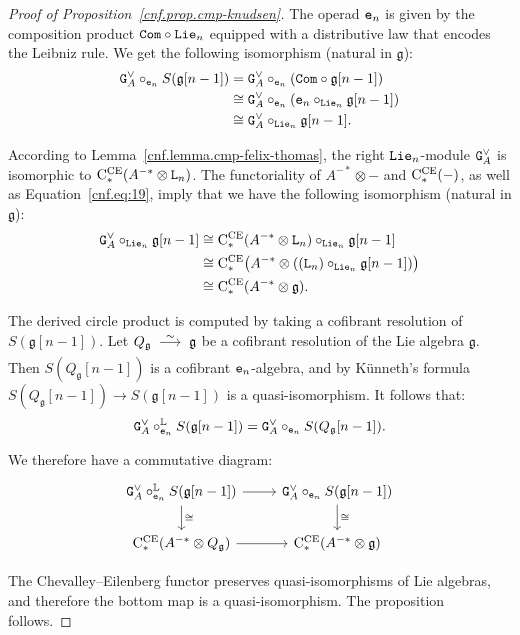 \begin{proof}[Proof of Proposition~\ref{cnf.prop.cmp-knudsen}]
  The operad $\mathtt{e}_{n}$ is given by the composition product $\mathtt{Com} \circ \mathtt{Lie}_{n}$ equipped with a distributive law that encodes the Leibniz rule.
  We get the following isomorphism (natural in $\mathfrak{g}$):
  \begin{align*}
    \mathtt{G}_{A}^{\vee} \circ_{\mathtt{e}_{n}} S(\mathfrak{g}[n-1])
    & = \mathtt{G}_{A}^{\vee} \circ_{\mathtt{e}_{n}} (\mathtt{Com} \circ \mathfrak{g}[n-1]) \\
    & \cong \mathtt{G}_{A}^{\vee} \circ_{\mathtt{e}_{n}} (\mathtt{e}_{n} \circ_{\mathtt{Lie}_{n}} \mathfrak{g}[n-1]) \\
    & \cong \mathtt{G}_{A}^{\vee} \circ_{\mathtt{Lie}_{n}} \mathfrak{g}[n-1].
  \end{align*}

  According to Lemma~\ref{cnf.lemma.cmp-felix-thomas}, the right $\mathtt{Lie}_{n}$-module $\mathtt{G}_{A}^{\vee}$ is isomorphic to $\mathrm{C}_{*}^{\mathrm{CE}}(A^{-*} \otimes \mathtt{L}_{n})$.
  The functoriality of $A^{-*} \otimes -$ and $\mathrm{C}_{*}^{\mathrm{CE}}(-)$, as well as Equation~\eqref{cnf.eq:19}, imply that we have the following isomorphism (natural in $\mathfrak{g}$):
  \begin{align*}
    \mathtt{G}_{A}^{\vee} \circ_{\mathtt{Lie}_{n}} \mathfrak{g}[n-1]
    & \cong \mathrm{C}_{*}^{\mathrm{CE}}(A^{-*} \otimes \mathtt{L}_{n}) \circ_{\mathtt{Lie}_{n}} \mathfrak{g}[n-1] \\
    & \cong \mathrm{C}_{*}^{\mathrm{CE}} \bigl( A^{-*} \otimes ((\mathtt{L}_{n}) \circ_{\mathtt{Lie}_{n}} \mathfrak{g}[n-1]) \bigr) \\
    & \cong \mathrm{C}_{*}^{\mathrm{CE}}(A^{-*} \otimes \mathfrak{g}).
  \end{align*}

  The derived circle product is computed by taking a cofibrant resolution of $S(\mathfrak{g}[n-1])$.
  Let $Q_{\mathfrak{g}} \qiso \mathfrak{g}$ be a cofibrant resolution of the Lie algebra $\mathfrak{g}$.
  Then $S(Q_{\mathfrak{g}}[n-1])$ is a cofibrant $\mathtt{e}_{n}$-algebra, and by Künneth's formula $S(Q_{\mathfrak{g}}[n-1]) \to S(\mathfrak{g}[n-1])$ is a quasi-isomorphism.
  It follows that:
  \[ \mathtt{G}_{A}^{\vee} \circ_{\mathtt{e}_{n}}^{\mathbb{L}} S(\mathfrak{g}[n-1]) = \mathtt{G}_{A}^{\vee} \circ_{\mathtt{e}_{n}} S(Q_{\mathfrak{g}}[n-1]).
  \]

  We therefore have a commutative diagram:
  \[ \begin{tikzcd}
      \GG{A}^{\vee} \circ_{\en}^{\mathbb{L}} S(\mathfrak{g}[n-1])
      \dar{\cong} \rar
      & \GG{A}^{\vee} \circ_{\en} S(\mathfrak{g}[n-1])
      \dar{\cong} \\
      \CCE(A^{-*} \otimes Q_{\mathfrak{g}})
      \rar
      & \CCE(A^{-*} \otimes \mathfrak{g})
    \end{tikzcd} \]

  The Chevalley--Eilenberg functor preserves quasi-isomorphisms of Lie algebras, and therefore the bottom map is a quasi-isomorphism.
  The proposition follows.
\end{proof}

